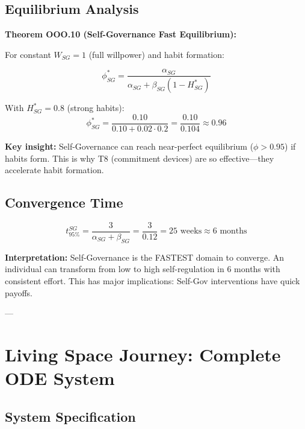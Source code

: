 \subsection{Equilibrium Analysis}

\textbf{Theorem OOO.10 (Self-Governance Fast Equilibrium):}

For constant $W_{SG} = 1$ (full willpower) and habit formation:

\begin{equation}
\phi^*_{SG} = \frac{\alpha_{SG}}{\alpha_{SG} + \beta_{SG}(1 - H^*_{SG})}
\end{equation}

With $H^*_{SG} = 0.8$ (strong habits):
\begin{equation}
\phi^*_{SG} = \frac{0.10}{0.10 + 0.02 \cdot 0.2} = \frac{0.10}{0.104} \approx 0.96
\end{equation}

\textbf{Key insight:} Self-Governance can reach near-perfect equilibrium ($\phi > 0.95$) if
habits form. This is why T8 (commitment devices) are so effective---they accelerate habit formation.

\subsection{Convergence Time}

\begin{equation}
t_{95\%}^{SG} = \frac{3}{\alpha_{SG} + \beta_{SG}} = \frac{3}{0.12} = 25 \text{ weeks} \approx 6 \text{ months}
\end{equation}

\textbf{Interpretation:} Self-Governance is the FASTEST domain to converge. An individual
can transform from low to high self-regulation in 6 months with consistent effort.
This has major implications: Self-Gov interventions have quick payoffs.

---


\section{Living Space Journey: Complete ODE System}
\label{ooo:living}

\subsection{System Specification}

